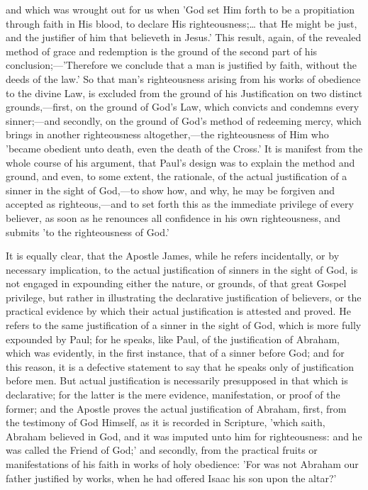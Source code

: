 \documentclass[
]{book}
\begin{document}
and which was wrought out for us when 'God set Him forth to be a propitiation through faith in His blood, to declare His righteousness;\ldots{} that He might be just, and the justifier of him that believeth in Jesus.' This result, again, of the revealed method of grace and redemption is the ground of the second part of his conclusion;---'Therefore we conclude that a man is justified by faith, without the deeds of the law.' So that man's righteousness arising from his works of obedience to the divine Law, is excluded from the ground of his Justification on two distinct grounds,---first, on the ground of God's Law, which convicts and condemns every sinner;---and secondly, on the ground of God's method of redeeming mercy, which brings in another righteousness altogether,---the righteousness of Him who 'became obedient unto death, even the death of the Cross.' It is manifest from the whole course of his argument, that Paul's design was to explain the method and ground, and even, to some extent, the rationale, of the actual justification of a sinner in the sight of God,---to show how, and why, he may be forgiven and accepted as righteous,---and to set forth this as the immediate privilege of every believer, as soon as he renounces all confidence in his own righteousness, and submits 'to the righteousness of God.'

It is equally clear, that the Apostle James, while he refers incidentally, or by necessary implication, to the actual justification of sinners in the sight of God, is not engaged in expounding either the nature, or grounds, of that great Gospel privilege, but rather in illustrating the declarative justification of believers, or the practical evidence by which their actual justification is attested and proved. He refers to the same justification of a sinner in the sight of God, which is more fully expounded by Paul; for he speaks, like Paul, of the justification of Abraham, which was evidently, in the first instance, that of a sinner before God; and for this reason, it is a defective statement to say that he speaks only of justification before men. But actual justification is necessarily presupposed in that which is declarative; for the latter is the mere evidence, manifestation, or proof of the former; and the Apostle proves the actual justification of Abraham, first, from the testimony of God Himself, as it is recorded in Scripture, 'which saith, Abraham believed in God, and it was imputed unto him for righteousness: and he was called the Friend of God;' and secondly, from the practical fruits or manifestations of his faith in works of holy obedience: 'For was not Abraham our father justified by works, when he had offered Isaac his son upon the altar?'
\end{document}

